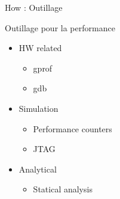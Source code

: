 %
\begin{Frame}{How : Outillage}
      \begin{block}{Outillage pour la performance}
        \begin{itemize}
        \item HW related
          \begin{itemize}
          \item gprof
          \item gdb
          \end{itemize}
        \item Simulation
          \begin{itemize}
          \item Performance counters
          \item JTAG
          \end{itemize}
        \item Analytical
          \begin{itemize}
          \item Statical analysis
          \end{itemize}
        \end{itemize}
      \end{block} 
\end{Frame}


